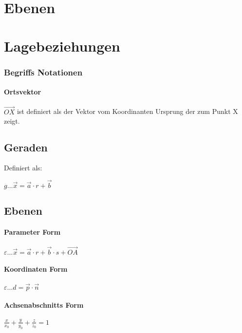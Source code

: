 \section{Ebenen}

\section{Lagebeziehungen}



\subsubsection{ Begriffs Notationen}

\paragraph*{Ortsvektor} \( \overrightarrow{OX} \) ist definiert als der Vektor vom Koordinanten Ursprung der zum Punkt X zeigt. \newline

\subsection*{ Geraden }
Definiert als:

\( g \dots \overrightarrow{x} = \overrightarrow{a} \cdot r + \overrightarrow{b} \)

\subsection*{ Ebenen}

\paragraph*{Parameter Form } \( \varepsilon ... \overrightarrow{x} = \overrightarrow{a} \cdot r + \overrightarrow{b} \cdot s + \overrightarrow{OA} \)

\paragraph*{Koordinaten Form} \( \varepsilon ... d = \overrightarrow{p } \cdot \overrightarrow{n} \)

\paragraph*{Achsenabschnitts Form} \( \frac{x}{x_0} + \frac{y}{y_0} + \frac{z}{z_0} = 1 \)

